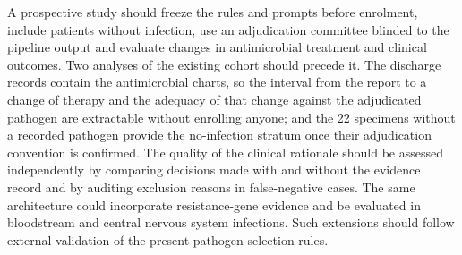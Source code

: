 A prospective study should freeze the rules and prompts before enrolment, include patients without infection, use an adjudication committee blinded to the pipeline output and evaluate changes in antimicrobial treatment and clinical outcomes. Two analyses of the existing cohort should precede it. The \kmuh discharge records contain the antimicrobial charts, so the interval from the report to a change of therapy and the adequacy of that change against the adjudicated pathogen are extractable without enrolling anyone; and the 22 specimens without a recorded pathogen provide the no-infection stratum once their adjudication convention is confirmed. The quality of the clinical rationale should be assessed independently by comparing decisions made with and without the evidence record and by auditing exclusion reasons in false-negative cases. The same architecture could incorporate resistance-gene evidence and be evaluated in bloodstream and central nervous system infections. Such extensions should follow external validation of the present pathogen-selection rules.
